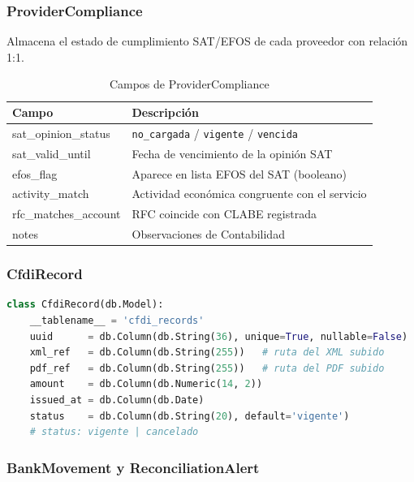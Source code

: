 \documentclass[12pt,a4paper]{article}
\begin{document}
\subsubsection{ProviderCompliance}

Almacena el estado de cumplimiento SAT/EFOS de cada proveedor con relaci\'on 1:1.

\begin{table}[h!]
\centering
\begin{tabularx}{\textwidth}{>{\ttfamily\small}l>{\small}X}
\toprule
\textnormal{\textbf{Campo}} & \textbf{Descripci\'on} \\
\midrule
sat\_opinion\_status & \texttt{no\_cargada} / \texttt{vigente} / \texttt{vencida} \\
sat\_valid\_until    & Fecha de vencimiento de la opini\'on SAT \\
efos\_flag           & Aparece en lista EFOS del SAT (booleano) \\
activity\_match      & Actividad econ\'omica congruente con el servicio \\
rfc\_matches\_account & RFC coincide con CLABE registrada \\
notes                & Observaciones de Contabilidad \\
\bottomrule
\end{tabularx}
\caption{Campos de ProviderCompliance}
\end{table}

\subsubsection{CfdiRecord}

\begin{lstlisting}[language=Python, caption={Modelo CfdiRecord}]
class CfdiRecord(db.Model):
    __tablename__ = 'cfdi_records'
    uuid      = db.Column(db.String(36), unique=True, nullable=False)
    xml_ref   = db.Column(db.String(255))   # ruta del XML subido
    pdf_ref   = db.Column(db.String(255))   # ruta del PDF subido
    amount    = db.Column(db.Numeric(14, 2))
    issued_at = db.Column(db.Date)
    status    = db.Column(db.String(20), default='vigente')
    # status: vigente | cancelado
\end{lstlisting}

\subsubsection{BankMovement y ReconciliationAlert}
\end{document}
